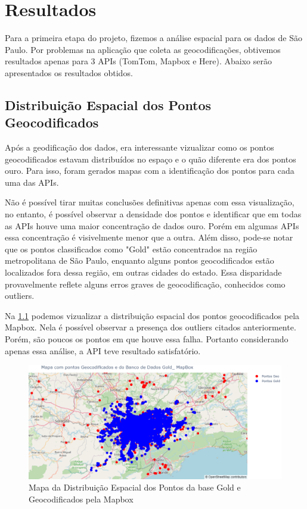 \chapter{Resultados} \label{resultado}
Para a primeira etapa do projeto, fizemos a análise espacial para os dados de São Paulo. Por problemas na aplicação que coleta as geocodificações, obtivemos resultados apenas para 3 APIs (TomTom, Mapbox e Here). Abaixo serão apresentados os resultados obtidos.

\section{Distribuição Espacial dos Pontos Geocodificados}
Após a geodificação dos dados, era interessante vizualizar como os pontos geocodificados estavam distribuídos no espaço e o quão diferente era dos pontos ouro. Para isso, foram gerados mapas com a identificação dos pontos para cada uma das APIs.

Não é possível tirar muitas conclusões definitivas apenas com essa visualização, no entanto, é possível observar a densidade dos pontos e identificar que em todas as APIs houve uma maior concentração de dados ouro. Porém em algumas APIs essa concentração é visivelmente menor que a outra. Além disso, pode-se notar que os pontos classificados como "Gold" estão concentrados na região metropolitana de São Paulo, enquanto alguns pontos geocodificados estão localizados fora dessa região, em outras cidades do estado. Essa disparidade provavelmente reflete alguns erros graves de geocodificação, conhecidos como outliers.

Na \ref{fig:mapapontos1} podemos vizualizar a distribuição espacial dos pontos geocodificados pela Mapbox. Nela é possível observar a presença dos outliers citados anteriormente. Porém, são poucos os pontos em que houve essa falha. Portanto considerando apenas essa análise, a API teve resultado satisfatório.

\begin{figure}[h]
  \centering
  \includegraphics[width=\textwidth]{Figuras/mapapontos1.png}
  \caption{Mapa da Distribuição Espacial dos Pontos da base Gold e Geocodificados pela Mapbox}
  \label{fig:mapapontos1}
\end{figure}

